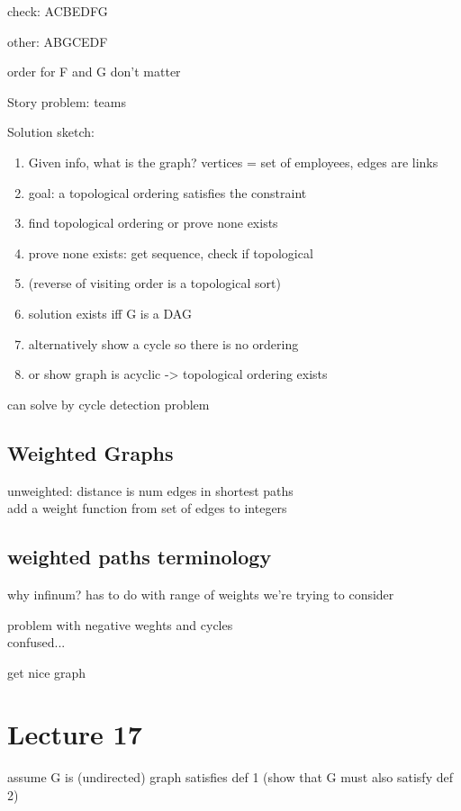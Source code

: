 \documentclass{article}
\begin{document}
check: ACBEDFG

other: ABGCEDF

order for F and G don't matter

Story problem: teams

Solution sketch:
\begin{enumerate}
    \item Given info, what is the graph? vertices = set of employees, edges are links
    \item goal: a topological ordering satisfies the constraint
    \item find topological ordering or prove none exists
    \item prove none exists: get sequence, check if topological
    \item (reverse of visiting order is a topological sort)
    \item solution exists iff G is a DAG 
    \item alternatively show a cycle so there is no ordering
    \item or show graph is acyclic -> topological ordering exists
\end{enumerate}
can solve by cycle detection problem





\subsection{Weighted Graphs}
unweighted: distance is num edges in shortest paths\\
add a weight function from set of edges to integers\\
\subsection{weighted paths terminology}
why infinum? has to do with range of weights we're trying to consider

problem with negative weghts and cycles\\
confused...

get nice graph


\section{Lecture 17}
assume G is (undirected) graph satisfies def 1 (show that G must also satisfy def 2)
\end{document}
